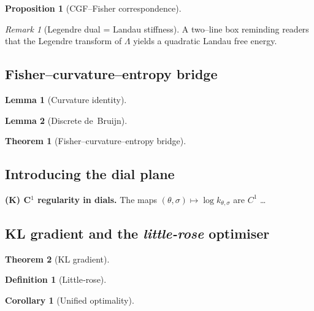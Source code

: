 \documentclass{article}
\theoremstyle{plain}
\newtheorem{theorem}{Theorem}[section]
\newtheorem{lemma}{Lemma}[section]
\newtheorem{corollary}{Corollary}[section]
\newtheorem{proposition}{Proposition}[section]
\theoremstyle{definition}
\newtheorem{definition}{Definition}[section]
\theoremstyle{remark}
\newtheorem{remark}{Remark}[section]
\begin{document}
		\begin{proposition}[CGF–Fisher correspondence]\label{prop:CGF}
		\end{proposition}

		\begin{remark}[Legendre dual = Landau stiffness]
			A two–line box reminding readers that the Legendre transform of $\Lambda$ yields a quadratic Landau free energy.
		\end{remark}

  	\subsection{Fisher–curvature–entropy bridge}
  
  		\begin{lemma}[Curvature identity]\label{lem:curv}
		\end{lemma}

		\begin{lemma}[Discrete de Bruijn]\label{lem:deBruijn}
		\end{lemma}

		\begin{theorem}[Fisher–curvature–entropy bridge]\label{thm:bridge}
		\end{theorem}

 	 \subsection{Introducing the dial plane}
		\begin{assumptionbox}
 			 \textbf{(K) C$^{1}$ regularity in dials.} The maps $(\theta,\sigma)\mapsto\log k_{\theta,\sigma}$ are $C^{1}$ …
		\end{assumptionbox}
	
  	\subsection{KL gradient and the \emph{little-rose} optimiser}
  
  		\begin{theorem}[KL gradient]\label{thm:KL}
		\end{theorem}

		\begin{definition}[Little‑rose]\label{def:littleRose}
		\end{definition}

		\begin{corollary}[Unified optimality]\label{cor:opt}
		\end{corollary}
\end{document}
